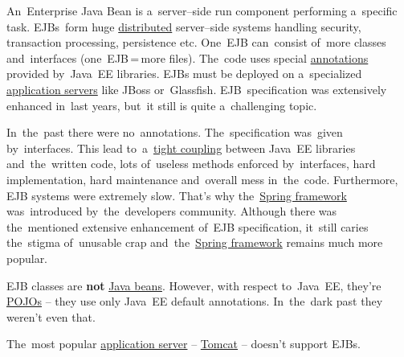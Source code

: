 \label{ejb}
An~Enterprise Java Bean is a~server--side run component performing a~specific task.
EJBs~form huge \hyperref[distributedsystem]{distributed} server--side systems handling security, transaction processing, persistence etc.
One~EJB can~consist of~more classes and~interfaces (one~EJB\,=\,more files).
The~code uses special \hyperref[annotations]{annotations} provided by~Java~EE libraries.
EJBs must be deployed on a~specialized \hyperref[applicationserver]{application servers} like JBoss or~Glassfish.
EJB~specification was extensively enhanced in~last years, but~it still is quite a~challenging topic.

In~the~past there were no~annotations.
The~specification was~given by~interfaces.
This lead to~a~\hyperref[loosetightcoupling]{tight coupling} between Java~EE libraries and~the~written code, lots of~useless methods enforced by~interfaces, hard implementation, hard maintenance and~overall mess in~the~code.
Furthermore, EJB systems were extremely slow.
That's why the~\hyperref[springframework]{Spring framework} was~introduced by~the~developers community.
Although there was the~mentioned extensive enhancement of~EJB specification, it~still caries the~stigma of~unusable crap and~the~\hyperref[springframework]{Spring framework} remains much more popular.

\warning EJB classes are \textbf{not} \hyperref[javabeans]{Java beans}.
However, with respect to~Java~EE, they're \hyperref[pojo]{POJOs} -- they use only Java~EE default annotations.
In~the~dark past they weren't even that.

\warning The~most popular \hyperref[applicationserver]{application server} -- \hyperref[tomcat]{Tomcat} -- doesn't support EJBs.
